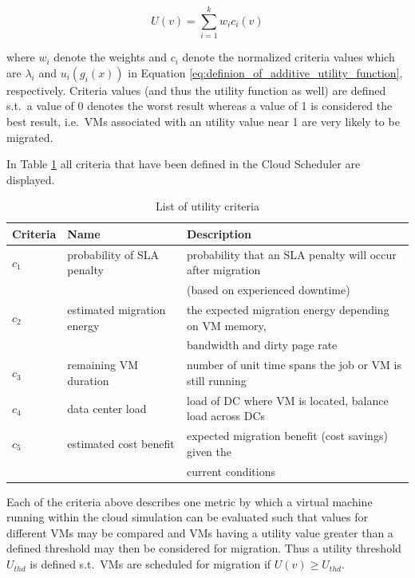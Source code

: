\begin{equation}
	U(v) = \sum_{i=1}^k w_i c_i (v)
\label{eq:cloud_scheduler_utility_function}
\end{equation}

where $w_i$ denote the weights and $c_i$ denote the normalized criteria values which are $\lambda_i$ and $u_i(g_i(x))$ in Equation \ref{eq:definion_of_additive_utility_function}, respectively. Criteria values (and thus the utility function as well) are defined s.t.~a value of 0 denotes the worst result whereas a value of 1 is considered the best result, i.e.~VMs associated with an utility value near 1 are very likely to be migrated. 

In Table \ref{tab:list_of_utility_criteria} all criteria that have been defined in the Cloud Scheduler are displayed. 

\begin{table}[htbp]
\centering
\begin{tabular}{lll}
  \hline
	Criteria & Name	& Description \\
  \hline
	$c_1$ & probability of SLA penalty & probability that an SLA penalty will occur after migration \\
																	  && (based on experienced downtime) \\
	$c_2$ & estimated migration energy & the expected migration energy depending on VM memory, \\
																		&& bandwidth and dirty page rate \\
	$c_3$ & remaining VM duration & number of unit time spans the job or VM is still running \\
	$c_4$ & data center load & load of DC where VM is located, balance load across DCs \\
	$c_5$ & estimated cost benefit & expected migration benefit (cost savings) given the \\
																		&& current conditions \\
   \hline
\end{tabular}
\caption{List of utility criteria}
\label{tab:list_of_utility_criteria}
\end{table}

Each of the criteria above describes one metric by which a virtual machine running within the cloud simulation can be evaluated such that values for different VMs may be compared and VMs having a utility value greater than a defined threshold may then be considered for migration. Thus a utility threshold $U_{thd}$ is defined s.t.~VMs are scheduled for migration if $U(v) \geq U_{thd}$. 

